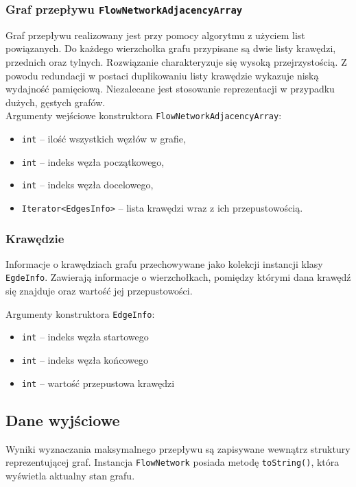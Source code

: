 \documentclass[10pt]{dokument-tiwo}
\begin{document}
\subsubsection{Graf przepływu \texttt{FlowNetworkAdjacencyArray}}
Graf przepływu realizowany jest przy pomocy algorytmu z użyciem list
powiązanych. Do każdego wierzchołka grafu przypisane są dwie listy krawędzi,
przednich oraz tylnych. Rozwiązanie charakteryzuje się wysoką przejrzystością. Z
powodu redundacji w postaci duplikowaniu listy krawędzie wykazuje niską
wydajność pamięciową. Niezalecane jest stosowanie reprezentacji w przypadku
dużych, gęstych grafów.\\

\noindent
Argumenty wejściowe konstruktora \texttt{FlowNetworkAdjacencyArray}:
\begin{itemize}
  \item \texttt{int} -- ilość wszystkich węzłów w grafie,
  \item \texttt{int} -- indeks węzła początkowego,
  \item \texttt{int} -- indeks węzła docelowego,
  \item \texttt{Iterator<EdgesInfo>} -- lista krawędzi wraz z ich przepustowością.
\end{itemize}

\subsubsection{Krawędzie}
Informacje o krawędziach grafu przechowywane jako kolekcji instancji klasy
\texttt{EgdeInfo}. Zawierają informacje o wierzchołkach, pomiędzy którymi
dana krawędź się znajduje oraz wartość jej przepustowości.

\noindent
Argumenty konstruktora \texttt{EdgeInfo}:
\begin{itemize}
  \item \texttt{int} -- indeks węzła startowego
  \item \texttt{int} -- indeks węzła końcowego
  \item \texttt{int} -- wartość przepustowa krawędzi
\end{itemize}

\subsection{Dane wyjściowe}
Wyniki wyznaczania maksymalnego przepływu są zapisywane wewnątrz struktury
reprezentującej graf. Instancja \texttt{FlowNetwork} posiada metodę
\texttt{toString()}, która wyświetla aktualny stan grafu.
\end{document}
